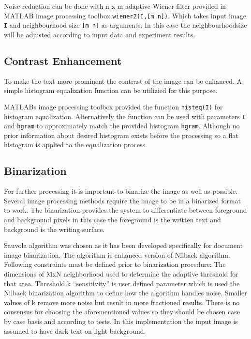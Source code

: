 \documentclass{article}
\def\code#1{\texttt{#1}}
\begin{document}
          Noise reduction can be done with n x m adaptive Wiener filter provided in MATLAB image processing toolbox \code{wiener2(I,[m n])}. Which takes input image \code{I} and neighbourhood size \code{[m n]} as arguments. In this case the neighbourhoodsize will be adjusted according to input data and experiment results.

        \subsection{Contrast Enhancement}
          To make the text more prominent the contrast of the image can be enhanced. A simple histogram equalization function can be utilizied for this purpose.

          MATLABs image processing toolbox provided the function \code{histeq(I)} for histogram equalization. Alternatively the function can be used with parameters \code{I} and \code{hgram} to approximately match the provided histogram \code{hgram}. Although no prior information about desired histogram exists before the processing so a flat histogram is applied to the equalization process.

        \subsection{Binarization}
          For further processing it is important to binarize the image as well as possible. Several image processing methods require the image to be in a binarized format to work. The binarization provides the system to differentiate between foreground and background pixels in this case the foreground is the written text and background is the writing surface.

          Sauvola algorithm was chosen as it has been developed specifically for document image binarization. The algorithm is enhanced version of Nilback algorithm. \cite{Sauvola2000} Following constraints must be defined prior to binarization procedure: The dimensions of MxN neighborhood used to determine the adaptive threshold for that area. Threshold k ``sensitivity'' is user defined parameter which is used the Nilback binarization algorithm to define how the algorithm handles noise. Smaller values of k remove more noise but result in more fractioned results. There is no consensus for choosing the aforementioned values so they should be chosen case by case basis and according to tests. In this implementation the input image is assumed to have dark text on light background.
\end{document}
